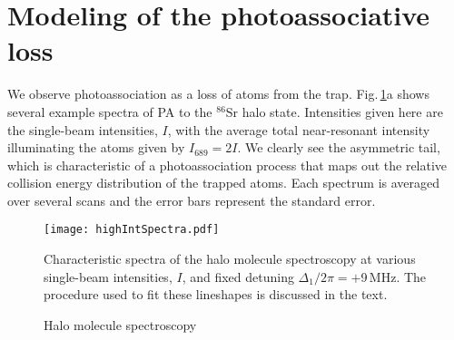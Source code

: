 



\section{Modeling of the photoassociative loss} \label{sec:highE_paLoss}
We observe photoassociation as a loss of atoms from the trap.
Fig.\,\ref{fig:highIntSpectra}a shows several example spectra of PA to the $^{86}$Sr halo state.
Intensities given here are the single-beam intensities, $I$, with the average total near-resonant intensity illuminating the atoms given by $I_{\text{689}}=2I$.
We clearly see the asymmetric tail, which is characteristic of a photoassociation process that maps out the relative collision energy distribution of the trapped atoms.
Each spectrum is averaged over several scans and the error bars represent the standard error.
	\begin{figure}
		\centerline{
		\texttt{[image: highIntSpectra.pdf]}}
		\caption{Halo molecule spectroscopy}{Characteristic spectra of the halo molecule spectroscopy at various single-beam intensities, $I$, and fixed detuning $\Delta_1/2\pi=+$9\,MHz. The procedure used to fit these lineshapes is discussed in the text.}
		\label{fig:highIntSpectra}
	\end{figure}
	
